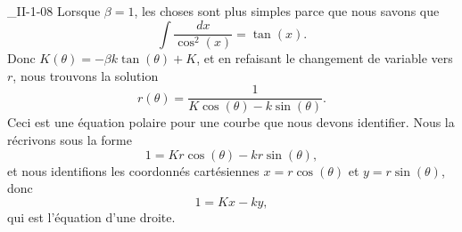 \begin{corrige}{_II-1-08}
Lorsque $\beta=1$, les choses sont plus simples parce que nous savons que 
\begin{equation}
	\int\frac{dx}{ \cos^2(x) }=\tan(x).
\end{equation}
Donc $K(\theta)=-\beta k\tan(\theta)+K$, et en refaisant le changement de variable vers $r$, nous trouvons la solution
\begin{equation}
	r(\theta)=\frac{1}{ K\cos(\theta)-k\sin(\theta) }.
\end{equation}
Ceci est une équation polaire pour une courbe que nous devons identifier. Nous la récrivons sous la forme
\begin{equation}
	1=Kr\cos(\theta)-kr\sin(\theta),
\end{equation}
et nous identifions les coordonnés cartésiennes $x=r\cos(\theta)$ et $y=r\sin(\theta)$, donc
\begin{equation}
	1=Kx-ky,
\end{equation}
qui est l'équation d'une droite.

\end{corrige}
